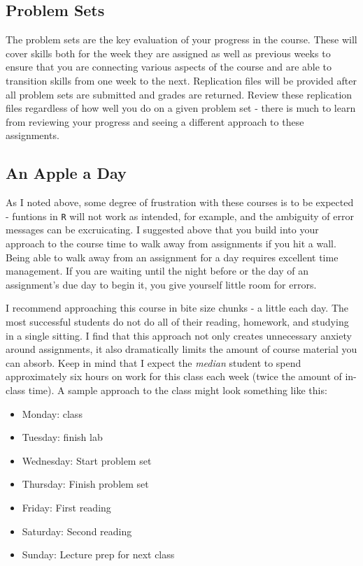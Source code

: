 \documentclass[]{book}
\providecommand{\tightlist}{%
  \setlength{\itemsep}{0pt}\setlength{\parskip}{0pt}}
\theoremstyle{definition}
\theoremstyle{definition}
\theoremstyle{definition}
\theoremstyle{remark}
\begin{document}
\subsection{Problem Sets}\label{problem-sets}

The problem sets are the key evaluation of your progress in the course.
These will cover skills both for the week they are assigned as well as
previous weeks to ensure that you are connecting various aspects of the
course and are able to transition skills from one week to the next.
Replication files will be provided after all problem sets are submitted
and grades are returned. Review these replication files regardless of
how well you do on a given problem set - there is much to learn from
reviewing your progress and seeing a different approach to these
assignments.

\subsection{An Apple a Day}\label{an-apple-a-day}

As I noted above, some degree of frustration with these courses is to be
expected - funtions in \texttt{R} will not work as intended, for
example, and the ambiguity of error messages can be excruicating. I
suggested above that you build into your approach to the course time to
walk away from assignments if you hit a wall. Being able to walk away
from an assignment for a day requires excellent time management. If you
are waiting until the night before or the day of an assignment's due day
to begin it, you give yourself little room for errors.

I recommend approaching this course in bite size chunks - a little each
day. The most successful students do not do all of their reading,
homework, and studying in a single sitting. I find that this approach
not only creates unnecessary anxiety around assignments, it also
dramatically limits the amount of course material you can absorb. Keep
in mind that I expect the \emph{median} student to spend approximately
six hours on work for this class each week (twice the amount of in-class
time). A sample approach to the class might look something like this:

\begin{itemize}
\tightlist
\item
  Monday: class
\item
  Tuesday: finish lab
\item
  Wednesday: Start problem set
\item
  Thursday: Finish problem set
\item
  Friday: First reading
\item
  Saturday: Second reading
\item
  Sunday: Lecture prep for next class
\end{itemize}
\end{document}

